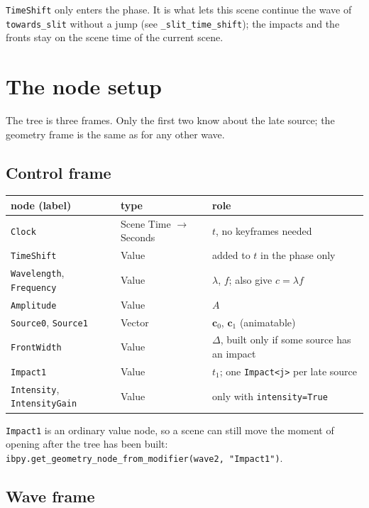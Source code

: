 \documentclass[11pt,a4paper]{article}
\newcommand{\node}[1]{\texttt{#1}}
\begin{document}
\node{TimeShift} only enters the phase. It is what lets this scene continue
the wave of \node{towards\_slit} without a jump (see
\node{\_slit\_time\_shift}); the impacts and the fronts stay on the scene time
of the current scene.

\section{The node setup}

The tree is three frames. Only the first two know about the late source; the
geometry frame is the same as for any other wave.

\subsection{Control frame}

\begin{center}
\begin{tabular}{@{}lll@{}}
\toprule
node (label) & type & role\\
\midrule
\node{Clock}      & Scene Time $\to$ Seconds & $t$, no keyframes needed\\
\node{TimeShift}  & Value & added to $t$ in the phase only\\
\node{Wavelength}, \node{Frequency} & Value & $\lambda$, $f$; also give $c=\lambda f$\\
\node{Amplitude}  & Value & $A$\\
\node{Source0}, \node{Source1} & Vector & $\mathbf c_0$, $\mathbf c_1$ (animatable)\\
\node{FrontWidth} & Value & $\Delta$, built only if some source has an impact\\
\node{Impact1}    & Value & $t_1$; one \node{Impact<j>} per late source\\
\node{Intensity}, \node{IntensityGain} & Value & only with \node{intensity=True}\\
\bottomrule
\end{tabular}
\end{center}

\node{Impact1} is an ordinary value node, so a scene can still move the moment
of opening after the tree has been built:
\verb|ibpy.get_geometry_node_from_modifier(wave2, "Impact1")|.

\subsection{Wave frame}
\end{document}
